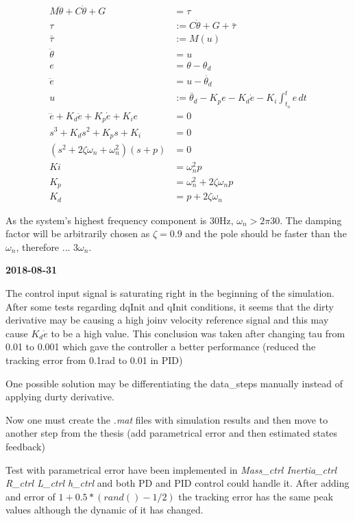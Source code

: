 \begin{align}
M\ddot{\theta} + C\dot{\theta} + G &= \tau \\
\tau &:= C\dot{\theta} + G + \bar{\tau} \\
\bar{\tau} &:= M(u)\\
\ddot{\theta} &= u \\
e &= \theta - \theta_d \\
\ddot{e} &= u - \ddot{\theta_d} \\
u &:= \ddot{\theta_d} - K_pe - K_d\dot{e} - K_i\int_{t_o}^{t}e \, dt \\
\dddot{e} + K_d\ddot{e} + K_p\dot{e} + K_ie &= 0 \\
s^3 + K_ds^2 + K_ps + K_i &= 0 \\
(s^2 + 2\zeta \omega_n + \omega_n^2)(s + p) &= 0 \\
Ki &= \omega_n^2p \\
K_p &= \omega_n^2 + 2\zeta \omega_np \\
K_d &= p + 2\zeta \omega_n 
\end{align}

As the system's highest frequency component is 30Hz, $\omega_n > 2\pi30$. The damping factor will be arbitrarily chosen as $\zeta = 0.9$ and the pole should be faster than the $\omega_n$, therefore ... $3\omega_n$.


\textbf{2018-08-31}

The control input signal is saturating right in the beginning of the simulation. After some tests regarding dqInit and qInit conditions, it seems that the dirty derivative may be causing a high joinv velocity reference signal and this may cause $K_d\dot{e}$ to be a high value. This conclusion was taken after changing tau from 0.01 to 0.001 which gave the controller a better performance (reduced the tracking error from 0.1rad to 0.01 in PID)

One possible solution may be differentiating the data\_steps manually instead of applying durty derivative.

Now one must create the \textit{.mat} files with simulation results and then move to another step from the thesis (add parametrical error and then estimated states feedback)

Test with parametrical error have been implemented in \textit{Mass\_ctrl Inertia\_ctrl R\_ctrl L\_ctrl h\_ctrl} and both PD and PID control could handle it. After adding and error of $1 + 0.5*(rand()-1/2)$ the tracking error has the same peak values although the dynamic of it has changed.

